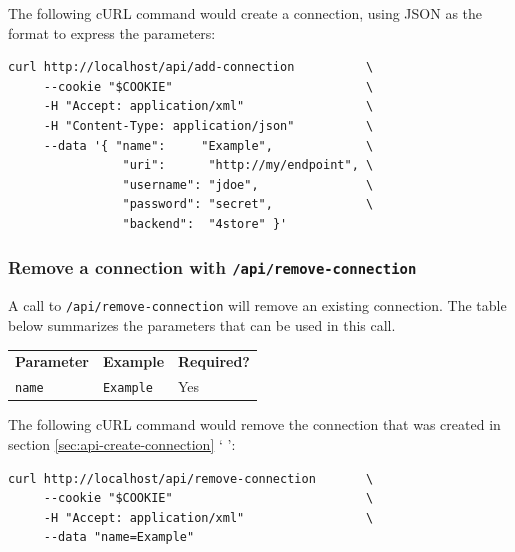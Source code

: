   The following cURL command would create a connection, using JSON as
  the format to express the parameters:

\begin{siderules}
\begin{verbatim}
curl http://localhost/api/add-connection          \
     --cookie "$COOKIE"                           \
     -H "Accept: application/xml"                 \
     -H "Content-Type: application/json"          \
     --data '{ "name":     "Example",             \
                "uri":      "http://my/endpoint", \
                "username": "jdoe",               \
                "password": "secret",             \
                "backend":  "4store" }'
\end{verbatim}
\end{siderules}

\subsubsection{Remove a connection with \texttt{/api/remove-connection}}

  A call to \texttt{/api/remove-connection} will remove an existing
  connection.  The table below summarizes the parameters that can be
  used in this call.

  \hypersetup{urlcolor=black}
  \begin{table}[H]
    \begin{tabularx}{\textwidth}{l!{\VRule[-1pt]}X!{\VRule[-1pt]}X}
      \headrow
      \textbf{Parameter} & \textbf{Example} & \textbf{Required?}\\
      \evenrow
      \texttt{name}      & \texttt{Example} & Yes\\
    \end{tabularx}
  \end{table}
  \hypersetup{urlcolor=LinkGray}

  The following cURL command would remove the connection that was created in
  section \ref{sec:api-create-connection} {\color{LinkGray}`%
    '}:

\begin{siderules}
\begin{verbatim}
curl http://localhost/api/remove-connection       \
     --cookie "$COOKIE"                           \
     -H "Accept: application/xml"                 \
     --data "name=Example"
\end{verbatim}
\end{siderules}

